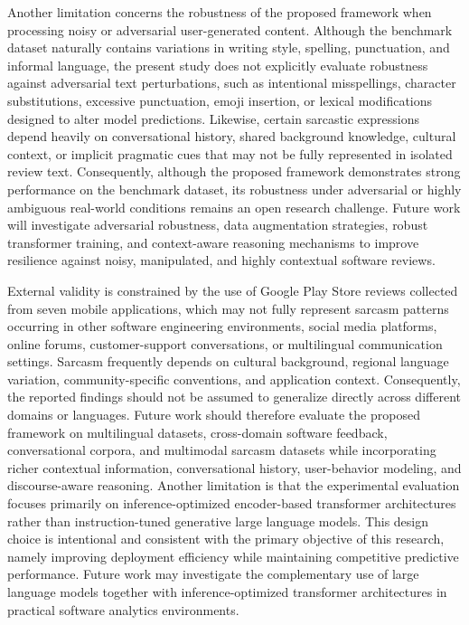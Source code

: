 \documentclass[a4paper,fleqn]{cas-sc}
\begin{document}
Another limitation concerns the robustness of the proposed framework when processing noisy or adversarial user-generated content. Although the benchmark dataset naturally contains variations in writing style, spelling, punctuation, and informal language, the present study does not explicitly evaluate robustness against adversarial text perturbations, such as intentional misspellings, character substitutions, excessive punctuation, emoji insertion, or lexical modifications designed to alter model predictions. Likewise, certain sarcastic expressions depend heavily on conversational history, shared background knowledge, cultural context, or implicit pragmatic cues that may not be fully represented in isolated review text. Consequently, although the proposed framework demonstrates strong performance on the benchmark dataset, its robustness under adversarial or highly ambiguous real-world conditions remains an open research challenge. Future work will investigate adversarial robustness, data augmentation strategies, robust transformer training, and context-aware reasoning mechanisms to improve resilience against noisy, manipulated, and highly contextual software reviews.

External validity is constrained by the use of Google Play Store reviews collected from seven mobile applications, which may not fully represent sarcasm patterns occurring in other software engineering environments, social media platforms, online forums, customer-support conversations, or multilingual communication settings. Sarcasm frequently depends on cultural background, regional language variation, community-specific conventions, and application context. Consequently, the reported findings should not be assumed to generalize directly across different domains or languages. Future work should therefore evaluate the proposed framework on multilingual datasets, cross-domain software feedback, conversational corpora, and multimodal sarcasm datasets while incorporating richer contextual information, conversational history, user-behavior modeling, and discourse-aware reasoning. Another limitation is that the experimental evaluation focuses primarily on inference-optimized encoder-based transformer architectures rather than instruction-tuned generative large language models. This design choice is intentional and consistent with the primary objective of this research, namely improving deployment efficiency while maintaining competitive predictive performance. Future work may investigate the complementary use of large language models together with inference-optimized transformer architectures in practical software analytics environments.
\end{document}
